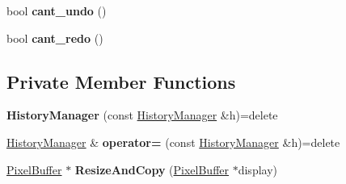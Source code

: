 \begin{DoxyCompactItemize}
\item 
bool {\bfseries cant\+\_\+undo} ()\hypertarget{classHistoryManager_a853284a3706ee57b963e9c978fcdcf7a}{}\label{classHistoryManager_a853284a3706ee57b963e9c978fcdcf7a}

\item 
bool {\bfseries cant\+\_\+redo} ()\hypertarget{classHistoryManager_ac4a9a3eeea33ba938fd7ca0bfeafd04b}{}\label{classHistoryManager_ac4a9a3eeea33ba938fd7ca0bfeafd04b}

\end{DoxyCompactItemize}
\subsection*{Private Member Functions}
\begin{DoxyCompactItemize}
\item 
{\bfseries History\+Manager} (const \hyperlink{classHistoryManager}{History\+Manager} \&h)=delete\hypertarget{classHistoryManager_a0690ec75506f596d1885e196e9b0558f}{}\label{classHistoryManager_a0690ec75506f596d1885e196e9b0558f}

\item 
\hyperlink{classHistoryManager}{History\+Manager} \& {\bfseries operator=} (const \hyperlink{classHistoryManager}{History\+Manager} \&h)=delete\hypertarget{classHistoryManager_aa16f6ffa95b2f7dc3dc31044e18563f3}{}\label{classHistoryManager_aa16f6ffa95b2f7dc3dc31044e18563f3}

\item 
\hyperlink{classimage__tools_1_1PixelBuffer}{Pixel\+Buffer} $\ast$ {\bfseries Resize\+And\+Copy} (\hyperlink{classimage__tools_1_1PixelBuffer}{Pixel\+Buffer} $\ast$display)\hypertarget{classHistoryManager_a65039aa3b3325eb0ae1be561e4fd64a9}{}\label{classHistoryManager_a65039aa3b3325eb0ae1be561e4fd64a9}

\end{DoxyCompactItemize}
